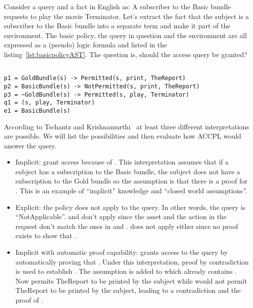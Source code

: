 Consider a query and a fact in English as: A subscriber to the Basic bundle requests to play the movie Terminator. Let's extract the fact that the subject is a subscriber to the Basic bundle into a separate term and make it part of the environment. The basic policy, the query in question and the environment are all expressed as a (pseudo) logic formula and listed in the listing~\ref{lst:basicpolicyAST}. The question is, should the access query be granted?

\lstset{mathescape, language=AST}  
\begin{lstlisting}[frame=single, caption={Basic Policy},label={lst:basicpolicyAST}]

p1 = GoldBundle(s) -> Permitted(s, print, TheReport) 
p2 = BasicBundle(s) -> NotPermitted(s, print, TheReport) 
p3 = ~GoldBundle(s) -> Permitted(s, play, Terminator)
q1 = (s, play, Terminator) 
e1 = BasicBundle(s)
\end{lstlisting}


According to Tschantz and Krishnamurthi~\cite{Tschantz} at least three different interpretations are possible. We will list the possibilities and then evaluate how \ac{ACCPL} would answer the query.

\begin{itemize}
\item Implicit: grant access because of . This interpretation assumes that if a subject has a subscription to the Basic bundle, the subject does not have a subscription to the Gold bundle so the assumption is that there is a proof for . This is an example of ``implicit'' knowledge and ``closed world assumptions''.

\item Explicit: the policy does not apply to the query. In other words, the query is ``NotApplicable''.  and  don't apply since the asset and the action in the request don't match the ones in  and .  does not apply either since no proof exists to show that . 

\item Implicit with automatic proof capability: grants access to the query by automatically proving that . Under this interpretation, proof by contradiction is used to establish . The assumption  is added to  which already contains . Now  permits TheReport to be printed by the subject while  would not permit TheReport to be printed by the subject, leading to a contradiction and the proof of .
\end{itemize}

